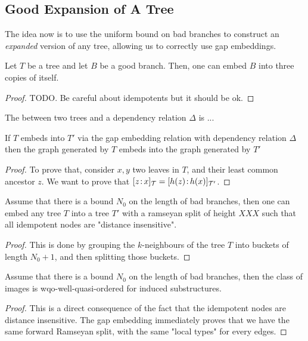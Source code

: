 \subsection{Good Expansion of A Tree}

The idea now is to use the uniform bound on bad branches to construct an
\emph{expanded} version of any tree, allowing us to correctly use gap
embeddings.

\begin{lemma}
    Let $T$ be a tree and let $B$ be a good branch. Then, one can embed     
    $B$ into three copies of itself.
\end{lemma}
\begin{proof}
    TODO. Be careful about idempotents but it should be ok.
\end{proof}

\begin{definition}
    The 
    between two trees and a dependency relation $\Delta$
    is ...
\end{definition}

\begin{lemma}
    If $T$ embeds into $T'$ via the gap embedding relation
    with dependency relation $\Delta$ then 
    the graph generated by $T$ embeds into the graph generated by $T'$
\end{lemma}
\begin{proof}
    To prove that, consider $x,y$ two leaves
    in $T$, and their least common ancestor $z$.
    We want to prove that
    $\tlbl{\t}{z}{x} = \tlbl{\t'}{h(z)}{h(x)}$.
\end{proof}



\begin{lemma}
    Assume that there is a bound $N_0$ on the length of bad branches, then
    one can embed any tree $T$ into a tree $T'$ with a ramseyan split of height $XXX$
    such that all idempotent nodes are "distance insensitive".
\end{lemma}
\begin{proof}
    This is done by grouping the $k$-neighbours of the tree $T$ into buckets of length $N_0 + 1$, and then
    splitting those buckets. 
\end{proof}

\begin{theorem}
    Assume that there is a bound $N_0$ on the length of bad branches, then
    the class of images is wqo-well-quasi-ordered for induced substructures.
\end{theorem}
\begin{proof}
    This is a direct consequence of the fact that the idempotent nodes are distance insensitive.
    The gap embedding immediately proves that we have the same forward Ramseyan split,
    with the same "local types" for every edges.
\end{proof}


